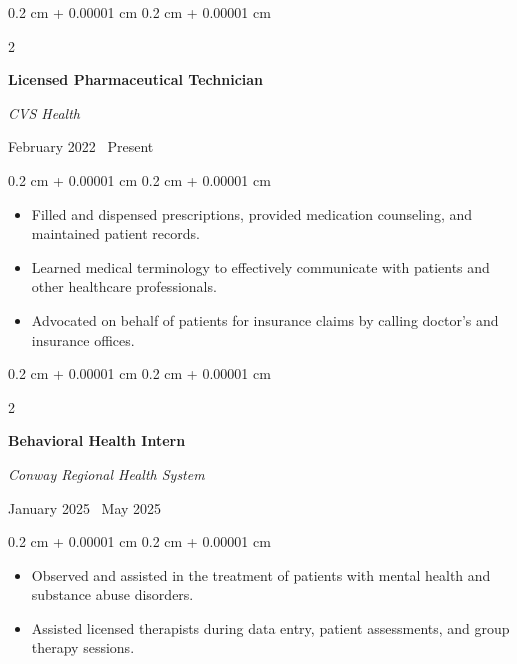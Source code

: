 \documentclass[10pt, letterpaper]{article}
\newenvironment{highlights}{
    \begin{itemize}[
        topsep=0.10 cm,
        parsep=0.10 cm,
        partopsep=0pt,
        itemsep=0pt,
        leftmargin=0.4 cm + 10pt
    ]
}{
    \end{itemize}
} %
\newenvironment{onecolentry}{
    \begin{adjustwidth}{
        0.2 cm + 0.00001 cm
    }{
        0.2 cm + 0.00001 cm
    }
}{
    \end{adjustwidth}
} %
\newenvironment{twocolentry}[2][]{
    \onecolentry
    \def\secondColumn{#2}
    \setcolumnwidth{\fill, 4.5 cm}
    \begin{paracol}{2}
}{
    \switchcolumn \raggedleft \secondColumn
    \end{paracol}
    \endonecolentry
} %
\begin{document}
\begin{samepage}

    \begin{twocolentry}{

            February 2022 \textendash\ Present}
        \textbf{Licensed Pharmaceutical Technician}

        \textit{CVS Health}
    \end{twocolentry}

    \vspace{0.10 cm}
    \begin{onecolentry}
        \begin{highlights}
            \item Filled and dispensed prescriptions, provided medication counseling, and maintained patient records.
            \item Learned medical terminology to effectively communicate with patients and other healthcare professionals.
            \item Advocated on behalf of patients for insurance claims by calling doctor's and insurance offices.
        \end{highlights}
    \end{onecolentry}

    \vspace{0.2 cm}

    \begin{twocolentry}{

            January 2025 \textendash\ May 2025}
        \textbf{Behavioral Health Intern}

        \textit{Conway Regional Health System}
    \end{twocolentry}
    \vspace{0.1 cm}
    \begin{onecolentry}
        \begin{highlights}
            \item Observed and assisted in the treatment of patients with mental health and substance abuse disorders.
            \item Assisted licensed therapists during data entry, patient assessments, and group therapy sessions.
        \end{highlights}
    \end{onecolentry}

\end{samepage}
\end{document}
